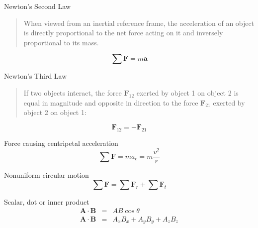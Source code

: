 \documentclass[avery5371]{flashcards}
\begin{document}
\begin{flashcard}[Chapter 5]{Newton's Second Law}
\bigskip
\begin{quote}
When viewed from an inertial reference frame, the acceleration of an object is directly proportional to the net force acting on it and inversely proportional to its mass.
\end{quote}
\begin{displaymath}
\sum \mathbf{F} = m\mathbf{a}
\end{displaymath}
\hfill
\end{flashcard}


\begin{flashcard}[Chapter 5]{Newton's Third Law}
\bigskip
\begin{quote}
If two objects interact, the force $\mathbf{F}_{12}$ exerted by object 1 on object 2 is equal in magnitude and opposite in direction to the force $\mathbf{F}_{21}$ exerted by object 2 on object 1:
\end{quote}
\begin{displaymath}
\mathbf{F}_{12} = -\mathbf{F}_{21}
\end{displaymath}
\hfill
\end{flashcard}


\begin{flashcard}[Chapter 6]{Force causing centripetal acceleration}
\bigskip
\bigskip
\begin{displaymath}
\sum \mathbf{F} = ma_{c} = m\frac{v^{2}}{r}
\end{displaymath}
\end{flashcard}

\begin{flashcard}[Chapter 6]{Nonuniform circular motion}
\bigskip
\bigskip
\begin{displaymath}
\sum \mathbf{F} = \sum \mathbf{F}_{r} + \sum \mathbf{F}_{t}
\end{displaymath}
\end{flashcard}


\begin{flashcard}[Chapter 7]{Scalar, dot or inner product}
\bigskip
\bigskip
\begin{eqnarray}
\mathbf{A}\cdot \mathbf{B} &=& AB \cos \theta \nonumber \\
\mathbf{A}\cdot \mathbf{B} &=& A_{x}B_{x} + A_{y}B_{y} + A_{z}B_{z} \nonumber
\end{eqnarray}
\end{flashcard}
\end{document}

